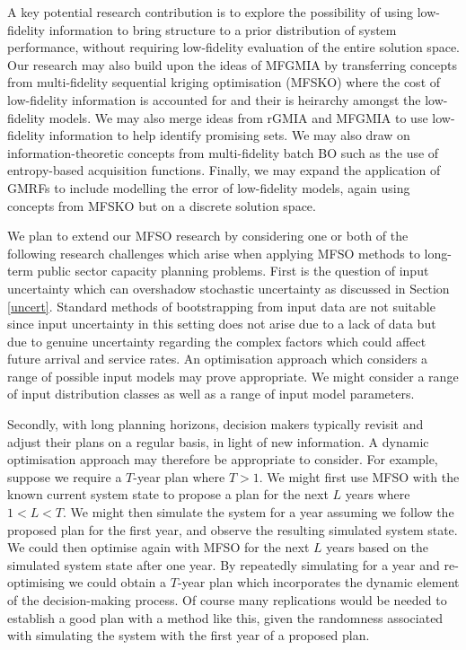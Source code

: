 \documentclass[12pt,a4paper]{article}
\begin{document}
A key potential research contribution is to explore the possibility of using low-fidelity information to bring structure to a prior distribution of system performance, without requiring low-fidelity evaluation of the entire solution space. Our research may also build upon the ideas of MFGMIA by transferring concepts from multi-fidelity sequential kriging optimisation (MFSKO) \citep{huang2006sequential} where the cost of low-fidelity information is accounted for and their is heirarchy amongst the low-fidelity models. We may also merge ideas from rGMIA and MFGMIA to use low-fidelity information to help identify promising sets. We may also draw on information-theoretic concepts from multi-fidelity batch BO such as the use of entropy-based acquisition functions. Finally, we may expand the application of GMRFs to include modelling the error of low-fidelity models, again using concepts from MFSKO but on a discrete solution space.

We plan to extend our MFSO research by considering one or both of the following research challenges which arise when applying MFSO methods to long-term public sector capacity planning problems. First is the question of input uncertainty which can overshadow stochastic uncertainty as discussed in Section \ref{uncert}. Standard methods of bootstrapping from input data are not suitable since input uncertainty in this setting does not arise due to a lack of data but due to genuine uncertainty regarding the complex factors which could affect future arrival and service rates. An optimisation approach which considers a range of possible input models may prove appropriate. We might consider a range of input distribution classes as well as a range of input model parameters.

Secondly, with long planning horizons, decision makers typically revisit and adjust their plans on a regular basis, in light of new information. A dynamic optimisation approach may therefore be appropriate to consider. For example, suppose we require a $T$-year plan where $T>1$. We might first use MFSO with the known current system state to propose a plan for the next $L$ years where $1<L<T$. We might then simulate the system for a year assuming we follow the proposed plan for the first year, and observe the resulting simulated system state. We could then optimise again with MFSO for the next $L$ years based on the simulated system state after one year. By repeatedly simulating for a year and re-optimising we could obtain a $T$-year plan which incorporates the dynamic element of the decision-making process. Of course many replications would be needed to establish a good plan with a method like this, given the randomness associated with simulating the system with the first year of a proposed plan.

\newpage



\end{document}
